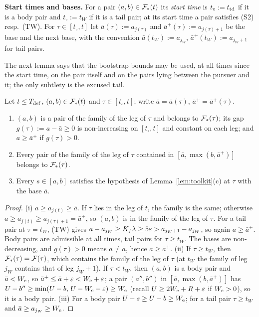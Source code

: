 \textbf{Start times and bases.} For a pair $(a,b)\in\mathcal{F}_*(t)$ its \emph{start time} is $t_\circ:=t_{\mathrm{td}}$ if it is a body
pair and $t_\circ:=t_W$ if it is a tail pair; at its start time a pair satisfies (S2) resp.\ (TW). For
$\tau\in[t_\circ,t]$ let $\bar a(\tau):=a_{j(\tau)}$ and $\bar a^+(\tau):=a_{j(\tau)+1}$ be the base and the next base,
with the convention $\bar a(t_W):=a_{j_W}$, $\bar a^+(t_W):=a_{j_W+1}$ for tail pairs.

The next lemma says that the bootstrap bounds may be used, at all times since the start time, on the pair itself and
on the pairs lying between the pursuer and it; the only subtlety is the excused tail.

\begin{lemma}[Locality]\label{lem:locality}
Let $t\le T_{\mathrm{def}}$, $(a,b)\in\mathcal{F}_*(t)$ and $\tau\in[t_\circ,t]$; write $\bar a=\bar a(\tau)$, $\bar a^+=\bar a^+(\tau)$.
\begin{enumerate}
\setlength{\itemsep}{1pt}\setlength{\parskip}{0pt}
\item[(i)] $(a,b)$ is a pair of the family of the leg of $\tau$ and belongs to $\mathcal{F}_*(\tau)$; its gap
$g(\tau):=a-\bar a\ge0$ is non-increasing on $[t_\circ,t]$ and constant on each leg; and $a\ge\bar a^+$ if $g(\tau)>0$.
\item[(ii)] Every pair of the family of the leg of $\tau$ contained in $[\bar a,\max(b,\bar a^+)]$ belongs to
$\mathcal{F}_*(\tau)$.
\item[(iii)] Every $s\in[a,b]$ satisfies the hypothesis of Lemma~\ref{lem:toolkit}(c) at $\tau$ with the base $\bar a$.
\end{enumerate}
\end{lemma}

\begin{proof}
(i) $a\ge a_{j(t)}\ge\bar a$. If $\tau$ lies in the leg of $t$, the family is the same; otherwise
$a\ge a_{j(t)}\ge a_{j(\tau)+1}=\bar a^+$, so $(a,b)$ is in the family of the leg of $\tau$. For a tail pair at
$\tau=t_W$, (TW) gives $a-a_{j_W}\ge K_f\lambda\ge5\varepsilon>a_{j_W+1}-a_{j_W}$, so again $a\ge\bar a^+$. Body pairs are
admissible at all times, tail pairs for $\tau\ge t_W$. The bases are non-decreasing, and $g(\tau)>0$ means $a\ne\bar a$,
hence $a\ge\bar a^+$.
(ii) If $\tau\ge t_W$, then $\mathcal{F}_*(\tau)=\mathcal{F}(\tau)$, which contains the family of the leg of $\tau$ (at $t_W$ the
family of leg $j_W$ contains that of leg $j_W+1$). If $\tau<t_W$, then $(a,b)$ is a body pair and $\bar a<W_{\mathrm{e}}$, so
$\bar a^+\le\bar a+\varepsilon<W_{\mathrm{e}}+\varepsilon$; a pair $(a'',b'')$ in $[\bar a,\max(b,\bar a^+)]$ has
$U-b''\ge\min(U-b,\,U-W_{\mathrm{e}}-\varepsilon)\ge W_{\mathrm{e}}$ (recall $U\ge2W_{\mathrm{e}}+R+\varepsilon$ if $W_{\mathrm{e}}>0$), so it is a body pair.
(iii) For a body pair $U-s\ge U-b\ge W_{\mathrm{e}}$; for a tail pair $\tau\ge t_W$ and $\bar a\ge a_{j_W}\ge W_{\mathrm{e}}$.
\end{proof}

